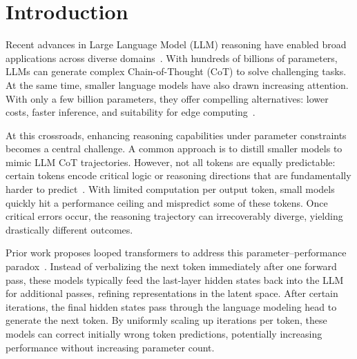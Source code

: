 \section{Introduction}
\label{sec:intro}

Recent advances in Large Language Model (LLM) reasoning have enabled broad applications across diverse domains~\citep{jaech2024openai-o1,guo2025deepseek-r1,yang2025qwen3}. 
With hundreds of billions of parameters, LLMs can generate complex Chain-of-Thought (CoT) to solve challenging tasks.
At the same time, smaller language models have also drawn increasing attention. 
With only a few billion parameters, they offer compelling alternatives: lower costs, faster inference, and suitability for edge computing~\citep{abdin2024phi3,minicpm4_2025,wang2025slm}.

At this crossroads, enhancing reasoning capabilities under parameter constraints becomes a central challenge. 
A common approach is to distill smaller models to mimic LLM CoT trajectories.
However, not all tokens are equally predictable: certain tokens encode critical logic or reasoning directions that are fundamentally harder to predict~\citep{lin2024rho, fu2025r2r, wang2025beyond}.
With limited computation per output token, small models quickly hit a performance ceiling and mispredict some of these tokens.
Once critical errors occur, the reasoning trajectory can irrecoverably diverge, yielding drastically different outcomes.

Prior work proposes looped transformers to address this parameter–performance paradox~\citep{hutchins2022block, saunshi2025loopedTrans, zeng2025pondering, zhu2025ouro}. 
Instead of verbalizing the next token immediately after one forward pass, these models typically feed the last-layer hidden states back into the LLM for additional passes, refining representations in the latent space.
After certain iterations, the final hidden states pass through the language modeling head to generate the next token.
By uniformly scaling up iterations per token, these models can correct initially wrong token predictions, potentially increasing performance without increasing parameter count.

